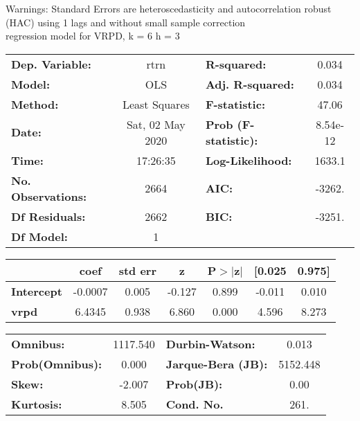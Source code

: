 Warnings: \newline
 [1] Standard Errors are heteroscedasticity and autocorrelation robust (HAC) using 1 lags and without small sample correction\\ 

regression model for VRPD, k = 6 h = 3\begin{center}
\begin{tabular}{lclc}
\toprule
\textbf{Dep. Variable:}    &       rtrn       & \textbf{  R-squared:         } &     0.034   \\
\textbf{Model:}            &       OLS        & \textbf{  Adj. R-squared:    } &     0.034   \\
\textbf{Method:}           &  Least Squares   & \textbf{  F-statistic:       } &     47.06   \\
\textbf{Date:}             & Sat, 02 May 2020 & \textbf{  Prob (F-statistic):} &  8.54e-12   \\
\textbf{Time:}             &     17:26:35     & \textbf{  Log-Likelihood:    } &    1633.1   \\
\textbf{No. Observations:} &        2664      & \textbf{  AIC:               } &    -3262.   \\
\textbf{Df Residuals:}     &        2662      & \textbf{  BIC:               } &    -3251.   \\
\textbf{Df Model:}         &           1      & \textbf{                     } &             \\
\bottomrule
\end{tabular}
\begin{tabular}{lcccccc}
                   & \textbf{coef} & \textbf{std err} & \textbf{z} & \textbf{P$> |$z$|$} & \textbf{[0.025} & \textbf{0.975]}  \\
\midrule
\textbf{Intercept} &      -0.0007  &        0.005     &    -0.127  &         0.899        &       -0.011    &        0.010     \\
\textbf{vrpd}      &       6.4345  &        0.938     &     6.860  &         0.000        &        4.596    &        8.273     \\
\bottomrule
\end{tabular}
\begin{tabular}{lclc}
\textbf{Omnibus:}       & 1117.540 & \textbf{  Durbin-Watson:     } &    0.013  \\
\textbf{Prob(Omnibus):} &   0.000  & \textbf{  Jarque-Bera (JB):  } & 5152.448  \\
\textbf{Skew:}          &  -2.007  & \textbf{  Prob(JB):          } &     0.00  \\
\textbf{Kurtosis:}      &   8.505  & \textbf{  Cond. No.          } &     261.  \\
\bottomrule
\end{tabular}
\end{center}


